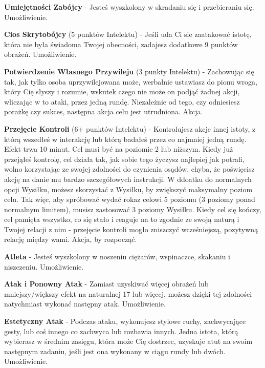\textbf{Umiejętności Zabójcy}\label{sec:Umiejętności Zabójcy} - Jesteś wyszkolony w skradaniu się i przebieraniu się. Umożliwienie.

\textbf{Cios Skrytobójcy}\label{sec:Cios Skrytobójcy} (5 punktów Intelektu) - Jeśli uda Ci sie zaatakować istotę, która nie była świadoma Twojej obecności, zadajesz dodatkowe 9 punktów obrażeń. Umożliwienie. 

\textbf{Potwierdzenie Własnego Przywileju}\label{sec:Potwierdzenie Własnego Przywileju} (3 punkty Intelektu) - Zachowując się tak, jak tylko osoba uprzywilejowana może, werbalnie ustawiasz do pionu wroga, który Cię słyszy i rozumie, wskutek czego nie może on podjąć żadnej akcji, wliczając w to ataki, przez jedną rundę. Niezależnie od tego, czy odniesiesz porażkę czy sukces, następna akcja celu jest utrudniona. Akcja.

\textbf{Przejęcie Kontroli}\label{sec:Przejęcie Kontroli} (6+ punktów Intelektu) - Kontrolujesz akcje innej istoty, z którą wszedłeś w interakcję lub którą badałeś przez co najmniej jedną rundę. Efekt trwa 10 minut. Cel musi być na poziomie 2 lub niższym. Kiedy już przejąłeś kontrolę, cel działa tak, jak sobie tego życzysz najlepiej jak potrafi, wolno korzystając ze swojej zdolności do czynienia osądów, chyba, że poświęcisz akcję na danie mu bardzo szczegółowych instrukcji. W ddoatku do normalnych opcji Wysiłku, możesz skorzystać z Wysiłku, by zwiększyć maksymalny poziom celu. Tak więc, aby spróbować wydać rokaz celowi 5 poziomu (3 poziomy ponad normalnym limitem), musisz zastosować 3 poziomy Wysiłku. Kiedy cel się kończy, cel pamięta wszystko, co się stało i reaguje na to zgodnie ze swoją naturą i Twojej relacji z nim - przejęcie kontroli mogło zniszczyć wcześniejszą, pozytywną relację między wami. Akcja, by rozpocząć.

\textbf{Atleta}\label{sec:Atleta} - Jesteś wyszkolony w noszeniu ciężarów, wspinaczce, skakaniu i niszczeniu. Umożliwienie.

\textbf{Atak i Ponowny Atak}\label{sec:Atak i Ponowny Atak} - Zamiast uzyskiwać więcej obrażeń lub mniejszy/większy efekt na naturalnej 17 lub więcej, możesz dzięki tej zdolności natychmiast wykonać następny atak. Umożliwienie.

\textbf{Estetyczny Atak}\label{sec:Estetyczny Atak} - Podczas ataku, wykonujesz stylowe ruchy, zachwycające gesty, lub coś innego co zachwyca lub rozbawia innych. Jedna istota, którą wybierasz w średnim zasięgu, która może Cię dostrzec, uzyskuje atut na swoim następnym zadaniu, jeśli jest ona wykonany w ciągu rundy lub dwóch. Umożliwienie.

